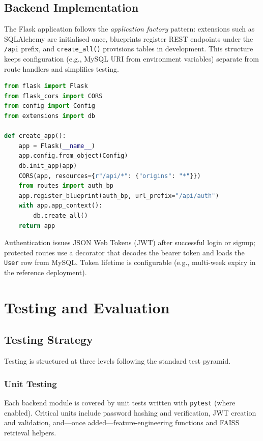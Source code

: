 \documentclass[12pt, a4paper, oneside]{report}
\begin{document}
\section{Backend Implementation}

The Flask application follows the \emph{application factory} pattern: extensions
such as SQLAlchemy are initialised once, blueprints register REST endpoints under
the \texttt{/api} prefix, and \texttt{create\_all()} provisions tables in
development. This structure keeps configuration (e.g., MySQL URI from
environment variables) separate from route handlers and simplifies testing.

\begin{lstlisting}[language=Python, caption={Flask application factory (simplified).}]
from flask import Flask
from flask_cors import CORS
from config import Config
from extensions import db

def create_app():
    app = Flask(__name__)
    app.config.from_object(Config)
    db.init_app(app)
    CORS(app, resources={r"/api/*": {"origins": "*"}})
    from routes import auth_bp
    app.register_blueprint(auth_bp, url_prefix="/api/auth")
    with app.app_context():
        db.create_all()
    return app
\end{lstlisting}

Authentication issues JSON Web Tokens (JWT) after successful login or signup;
protected routes use a decorator that decodes the bearer token and loads the
\texttt{User} row from MySQL. Token lifetime is configurable (e.g., multi-week
expiry in the reference deployment).

\chapter{Testing and Evaluation}

\section{Testing Strategy}

Testing is structured at three levels following the standard test pyramid.

\subsection{Unit Testing}

Each backend module is covered by unit tests written with \texttt{pytest}
(where enabled). Critical units include password hashing and verification,
JWT creation and validation, and---once added---feature-engineering functions
and FAISS retrieval helpers.
\end{document}
